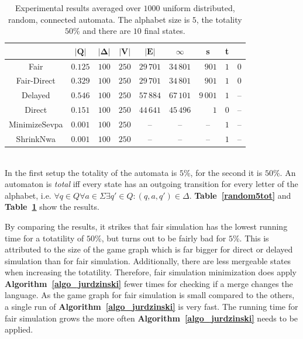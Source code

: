 \documentclass[12pt,oneside,bibliography=totoc,abstracton]{scrartcl}
\newcommand{\emptyccell}{\multicolumn{1}{c}{--}}
\newcommand{\emptyccellrightended}{\multicolumn{1}{c|}{--}}
\newcommand{\tableref}[1]{\textbf{Table~\ref{#1}}}
\newcommand{\algoref}[1]{\textbf{Algorithm~\ref{#1}}}
\begin{document}
\begin{table}[h]
\begin{center}
\begin{tabular}{|c|lrrrrrrr|}
			&\multicolumn{1}{c}{\cellcolor{black!30}$\bm{|Q|}$}
			&\multicolumn{1}{c}{\cellcolor{black!30}$\bm{|\Delta|}$}
			&\multicolumn{1}{c}{\cellcolor{black!30}$\bm{|V|}$}
			&\multicolumn{1}{c}{\cellcolor{black!30}$\bm{|E|}$}
			&\multicolumn{1}{c}{\cellcolor{black!30}$\bm{\infty}$}
			&\multicolumn{1}{c}{\cellcolor{black!30}\textbf{s}}
			&\multicolumn{1}{c|}{\cellcolor{black!30}\textbf{t}}\\
			\hline
			Fair			&$0.125$	&$100$	&$250$	&$29\,701$	&$34\,801$	&$901$	&$1$	&$0$\\
			Fair-Direct		&$0.329$	&$100$	&$250$	&$29\,701$	&$34\,801$	&$901$	&$1$	&$0$\\
			Delayed		&$0.546$	&$100$	&$250$	&$57\,884$	&$67\,101$	&$9\,001$	&$1$	&\emptyccellrightended\\
			Direct			&$0.151$	&$100$	&$250$	&$44\,641$	&$45\,496$	&$1$		&$0$	&\emptyccellrightended\\
			MinimizeSevpa	&$0.001$	&$100$	&$250$	&\emptyccell	&\emptyccell	&\emptyccell	&$1$	&\emptyccellrightended\\
			ShrinkNwa		&$0.001$	&$100$	&$250$	&\emptyccell	&\emptyccell	&\emptyccell	&$1$	&\emptyccellrightended\\
			\hline
		\end{tabular}
	\end{center}
	\caption{Experimental results averaged over $1000$ uniform distributed, random, connected automata.
		The alphabet size is $5$, the totality $50$\% and there are $10$ final states.}
	\label{random50tot}
\end{table}\quad\\
In the first setup the totality of the automata is $5$\%, for the second it is $50$\%.
An automaton is \textit{total} iff every state has an outgoing transition for every letter of the alphabet,
i.e. $\forall q \in Q \forall a \in \Sigma \exists q' \in Q : (q, a, q') \in \Delta$.
\tableref{random5tot} and \tableref{random50tot} show the results.

By comparing the results, it strikes that fair simulation has the lowest running time for a totatility of $50$\%,
but turns out to be fairly bad for $5$\%. This is attributed to the size of the game graph which is far
bigger for direct or delayed simulation than for fair simulation. Additionally, there are less mergeable
states when increasing the totatility. Therefore, fair simulation minimization does apply \algoref{algo_jurdzinski} fewer
times for checking if a merge changes the language. As the game graph for fair simulation is small compared to the others,
a single run of \algoref{algo_jurdzinski} is very fast. The running time for fair simulation grows the more
often \algoref{algo_jurdzinski} needs to be applied.
\end{document}
